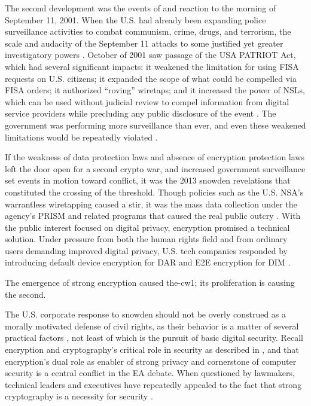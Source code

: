 
The second development was the events of and reaction to the morning of September 11, 2001. When the U.S. had already
been expanding police surveillance activities to combat communism, crime, drugs, and terrorism, the scale and audacity
of the September 11 attacks to some justified yet greater investigatory powers \cite{bloss_escalating_2007}. October of
2001 saw passage of the USA PATRIOT Act, which had several significant impacts: it weakened the limitation for using
\ac{FISA} requests on U.S. citizens; it expanded the scope of what could be compelled via \ac{FISA} orders; it
authorized ``roving'' wiretaps; and it increased the power of \acp{NSL}, which can be used without judicial review to
compel information from digital service providers while precluding any public disclosure of the event
\cite{sensenbrenner_2001} \cite{shamsi_2011}. The government was performing more surveillance than ever, and even these
weakened limitations would be repeatedly violated \cite{shamsi_2011} \cite{tucker_2020}.

If the weakness of data protection laws and absence of encryption protection laws left the door open for a second crypto
war, and increased government surveillance set events in motion toward conflict, it was the 2013 \ac{snowden}
revelations that constituted the crossing of the threshold. Though policies such as the U.S. \ac{NSA}'s warrantless
wiretapping caused a stir, it was the mass data collection under the agency's \ac{PRISM} and related programs that
caused the real public outcry \cite{landau_making_2013}. With the public interest focused on digital privacy, encryption
promised a technical solution. Under pressure from both the human rights field and from ordinary users demanding
improved digital privacy, U.S. tech companies responded by introducing default device encryption for \acl{DAR} and
\acl{E2E} encryption for \acl{DIM} \cite{treguer_us_2018}.

The emergence of strong encryption caused \ac{the-cw1}; its proliferation is causing the second.

The U.S. corporate response to \ac{snowden} should not be overly construed as a morally motivated defense of civil
rights, as their behavior is a matter of several practical factors \cite{treguer_us_2018}, not least of which is the
pursuit of basic digital security. Recall encryption and cryptography's critical role in security as described in
, and that encryption's dual role as enabler of strong privacy and cornerstone of computer
security is a central conflict in the \ac{EA} debate. When questioned by lawmakers, technical leaders and executives
have repeatedly appealed to the fact that strong cryptography is a necessity for security \cite{schulze_clipper_2017}.

